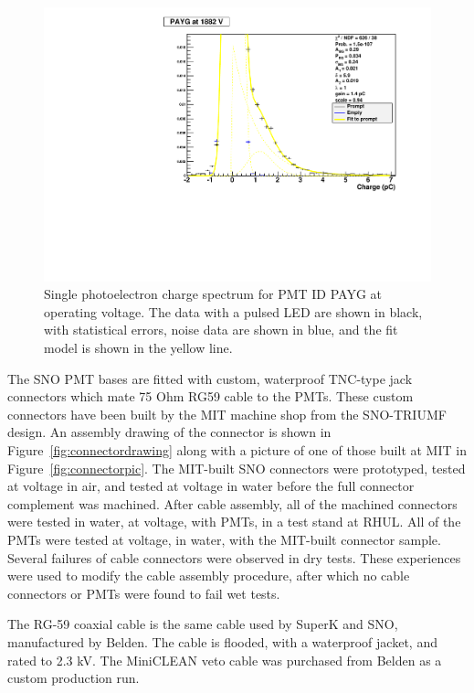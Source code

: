 \documentclass{JINST}
\begin{document}
\begin{figure}[ht]
\begin{center}
\includegraphics[width=4.5in]{graphics/PAYG_singlePE.pdf}
\caption{Single photoelectron charge spectrum for PMT ID PAYG at operating voltage.  The data with a pulsed LED are shown in black, with statistical errors, noise data are shown in blue, and the fit model is shown in the yellow line.
\label{fig:pmt_spe_q}}
\end{center}
\end{figure}

The SNO PMT bases are fitted with custom, waterproof TNC-type jack
connectors which mate 75 Ohm RG59 cable to the PMTs.  These custom
connectors have been built by the MIT machine shop from the SNO-TRIUMF
design. An assembly drawing of the connector is shown in
Figure~\ref{fig:connectordrawing} along with a picture of one of those
built at MIT in Figure~\ref{fig:connectorpic}. The MIT-built SNO
connectors were prototyped, tested at voltage in air, and tested at
voltage in water before the full connector complement was machined.
After cable assembly, all of the machined connectors were tested in
water, at voltage, with PMTs, in a test stand at RHUL.  All of the
PMTs were tested at voltage, in water, with the MIT-built connector
sample.  Several failures of cable connectors were observed in dry
tests.  These experiences were used to modify the cable assembly
procedure, after which no cable connectors or PMTs were found to fail
wet tests.

The RG-59 coaxial cable is the same cable used by SuperK and SNO,
manufactured by Belden.  The cable is flooded, with a waterproof
jacket, and rated to 2.3 kV.  The MiniCLEAN veto cable was purchased
from Belden as a custom production run.  
\end{document}
